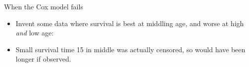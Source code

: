 \documentclass[
  ignorenonframetext,
]{beamer}
\newenvironment{Shaded}{\begin{snugshade}}{\end{snugshade}}
\newcommand{\DataTypeTok}[1]{\textcolor[rgb]{0.13,0.29,0.53}{#1}}
\newcommand{\DecValTok}[1]{\textcolor[rgb]{0.00,0.00,0.81}{#1}}
\newcommand{\KeywordTok}[1]{\textcolor[rgb]{0.13,0.29,0.53}{\textbf{#1}}}
\newcommand{\NormalTok}[1]{#1}
\newcommand{\OperatorTok}[1]{\textcolor[rgb]{0.81,0.36,0.00}{\textbf{#1}}}
\newcommand{\StringTok}[1]{\textcolor[rgb]{0.31,0.60,0.02}{#1}}
\providecommand{\tightlist}{%
  \setlength{\itemsep}{0pt}\setlength{\parskip}{0pt}}
\begin{document}
\begin{frame}[fragile]{When the Cox model fails}
\protect\hypertarget{when-the-cox-model-fails}{}

\begin{itemize}
\tightlist
\item
  Invent some data where survival is best at middling age, and worse at
  high \emph{and} low age:
\end{itemize}

\begin{Shaded}
\end{Shaded}

\begin{itemize}
\tightlist
\item
  Small survival time 15 in middle was actually censored, so would have
  been longer if observed.
\end{itemize}

\end{frame}
\end{document}
